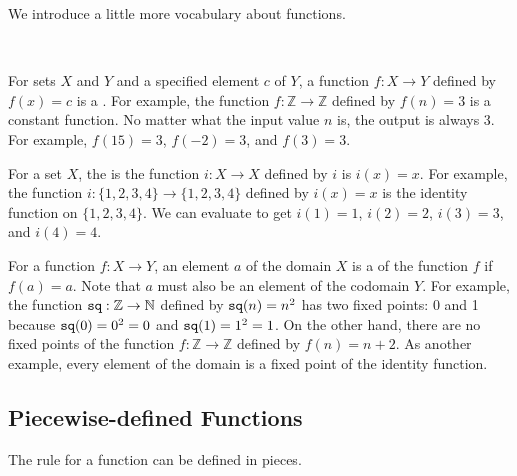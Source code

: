 We introduce a little more vocabulary about functions.

\begin{defn}
\label{defn_constant_identity_fixed_points}
~
    \begin{apart}
        \item For sets $X$ and $Y$ and a specified element $c$ of $Y$, a function $f: X \to Y$ defined by $f(x)=c$ is a . For example, the function $f: \mathbb{Z} \to \mathbb{Z}$ defined by $f(n) = 3$ is a constant function.  No matter what the input value $n$ is, the output is always 3.  For example, $f(15) = 3$, $f(-2) = 3$, and $f(3)=3$.
        \item For a set $X$, the  is the function $i: X \to X$ defined by $i$ is $i(x) = x$. For example, the function $i: \{1,2,3,4\}\to \{1,2,3,4\}$ defined by $i(x) = x$ is the identity function on $\{1,2,3,4\}$.  We can evaluate to get $i(1)=1$, $i(2)=2$, $i(3)=3$, and $i(4)=4$.
        \item For a function $f:X\to Y$, an element $a$ of the domain $X$ is a  of the function $f$ if $f(a) = a$. Note that $a$ must also be an element of the codomain $Y$. For example, the function $\texttt{sq}: \mathbb{Z} \to \mathbb{N}$ defined by $\texttt{sq}(n) = n^2$ has two fixed points: 0 and 1 because $\texttt{sq}(0)=0^2=0$ and $\texttt{sq}(1)=1^2=1$.  On the other hand, there are no fixed points of the function $f: \mathbb{Z} \to \mathbb{Z}$ defined by $f(n) = n+2$. As another example, every element of the domain is a fixed point of the identity function.  
    \end{apart}
\end{defn}


\newcommand{\subpiecewise}{Piecewise-defined Functions}
\subsection{\subpiecewise}
\label{sub_piecewise}

The rule for a function can be defined in pieces.  

